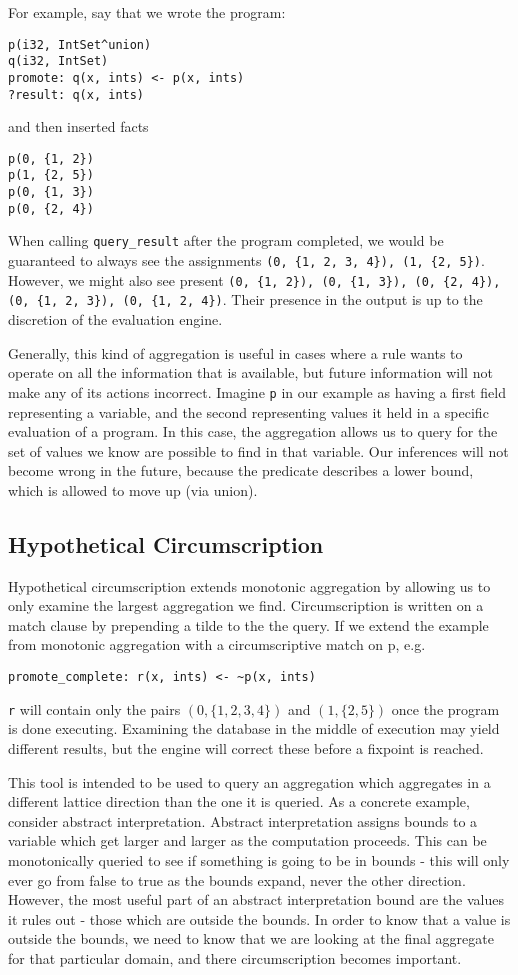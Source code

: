 For example, say that we wrote the program:
\begin{verbatim}
p(i32, IntSet^union)
q(i32, IntSet)
promote: q(x, ints) <- p(x, ints)
?result: q(x, ints)
\end{verbatim}
and then inserted facts
\begin{verbatim}
p(0, {1, 2})
p(1, {2, 5})
p(0, {1, 3})
p(0, {2, 4})
\end{verbatim}

When calling \texttt{query\_result} after the program completed, we would be guaranteed to always see the assignments \texttt{(0, \{1, 2, 3, 4\}), (1, \{2, 5\})}.
However, we might also see present \texttt{(0, \{1, 2\}), (0, \{1, 3\}), (0, \{2, 4\}), (0, \{1, 2, 3\}), (0, \{1, 2, 4\})}.
Their presence in the output is up to the discretion of the evaluation engine.

Generally, this kind of aggregation is useful in cases where a rule wants to operate on all the information that is available, but future information will not make any of its actions incorrect.
Imagine \texttt{p} in our example as having a first field representing a variable, and the second representing values it held in a specific evaluation of a program.
In this case, the aggregation allows us to query for the set of values we know are possible to find in that variable.
Our inferences will not become wrong in the future, because the predicate describes a lower bound, which is allowed to move up (via union).
\subsection{Hypothetical Circumscription}
\label{holmes:sec:circ}
Hypothetical circumscription extends monotonic aggregation by allowing us to only examine the largest aggregation we find.
Circumscription is written on a match clause by prepending a tilde to the the query.
If we extend the example from monotonic aggregation with a circumscriptive match on p, e.g.
\begin{verbatim}
promote_complete: r(x, ints) <- ~p(x, ints)
\end{verbatim}
\texttt{r} will contain only the pairs $(0, \{1, 2, 3, 4\})$ and $(1, \{2, 5\})$ once the program is done executing.
Examining the database in the middle of execution may yield different results, but the engine will correct these before a fixpoint is reached.

This tool is intended to be used to query an aggregation which aggregates in a different lattice direction than the one it is queried.
As a concrete example, consider abstract interpretation.
Abstract interpretation assigns bounds to a variable which get larger and larger as the computation proceeds.
This can be monotonically queried to see if something is going to be in bounds - this will only ever go from false to true as the bounds expand, never the other direction.
However, the most useful part of an abstract interpretation bound are the values it rules out - those which are outside the bounds.
In order to know that a value is outside the bounds, we need to know that we are looking at the final aggregate for that particular domain, and there circumscription becomes important.

